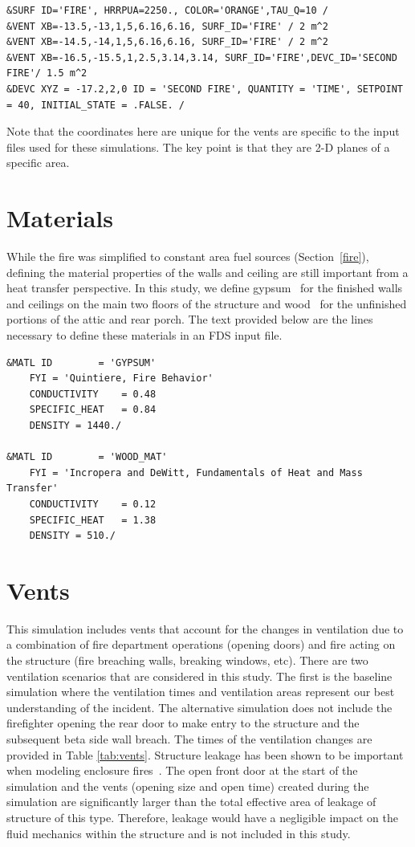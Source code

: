 \documentclass[11pt,oneside]{book}
\begin{document}
\begin{lstlisting}
&SURF ID='FIRE', HRRPUA=2250., COLOR='ORANGE',TAU_Q=10 /
&VENT XB=-13.5,-13,1,5,6.16,6.16, SURF_ID='FIRE' / 2 m^2
&VENT XB=-14.5,-14,1,5,6.16,6.16, SURF_ID='FIRE' / 2 m^2
&VENT XB=-16.5,-15.5,1,2.5,3.14,3.14, SURF_ID='FIRE',DEVC_ID='SECOND FIRE'/ 1.5 m^2
&DEVC XYZ = -17.2,2,0 ID = 'SECOND FIRE', QUANTITY = 'TIME', SETPOINT = 40, INITIAL_STATE = .FALSE. /
\end{lstlisting}
Note that the coordinates here are unique for the vents are specific to the input files used for these simulations. The key point is that they are 2-D planes of a specific area.

\section{Materials}
\label{matl}
While the fire was simplified to constant area fuel sources (Section~\ref{fire}), defining the material properties of the walls and ceiling are still important from a heat transfer perspective. In this study, we define gypsum~\cite{Quintiere:2} for the finished walls and ceilings on the main two floors of the structure and wood~\cite{Incropera:1} for the unfinished portions of the attic and rear porch. The text provided below are the lines necessary to define these materials in an FDS input file.

\begin{lstlisting}
&MATL ID        = 'GYPSUM'
    FYI = 'Quintiere, Fire Behavior' 
    CONDUCTIVITY    = 0.48
    SPECIFIC_HEAT   = 0.84
    DENSITY = 1440./

&MATL ID        = 'WOOD_MAT'
    FYI = 'Incropera and DeWitt, Fundamentals of Heat and Mass Transfer'
    CONDUCTIVITY    = 0.12
    SPECIFIC_HEAT   = 1.38
    DENSITY = 510./ 
\end{lstlisting}

\section{Vents}
\label{Vents}
This simulation includes vents that account for the changes in ventilation due to a combination of fire department operations (opening doors) and fire acting on the structure (fire breaching walls, breaking windows, etc). There are two ventilation scenarios that are considered in this study. The first is the baseline simulation where the ventilation times and ventilation areas represent our best understanding of the incident. The alternative simulation does not include the firefighter opening the rear door to make entry to the structure and the subsequent beta side wall breach. The times of the ventilation changes are provided in Table \ref{tab:vents}. Structure leakage has been shown to be important when modeling enclosure fires~\cite{beal2009}. The open front door at the start of the simulation and the vents (opening size and open time) created during the simulation are significantly larger than the total effective area of leakage of structure of this type. Therefore, leakage would have a negligible impact on the fluid mechanics within the structure and is not included in this study.
\end{document}
